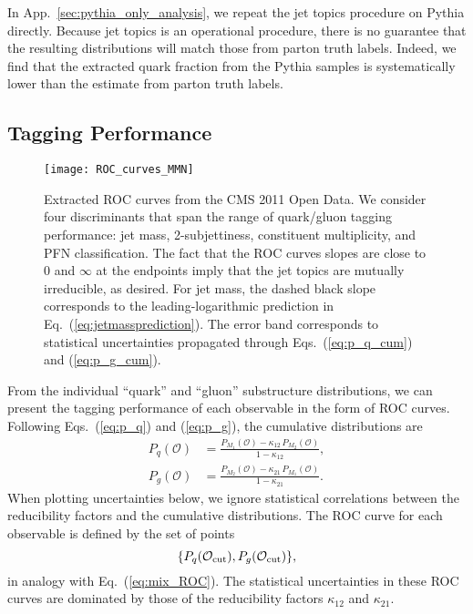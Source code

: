 \documentclass[aps,prd,twocolumn,preprintnumbers,nofootinbib,longbibliography,floatfix]{revtex4-1}
\DeclareRobustCommand{\App}[1]{App.~\ref{#1}}
\DeclareRobustCommand{\Eq}[1]{Eq.~(\ref{#1})}
\DeclareRobustCommand{\Eqs}[2]{Eqs.~(\ref{#1}) and (\ref{#2})}
\newcommand{\figO}{\mathcal{O}}
\newcommand{\ka}{\kappa}
\newcommand{\Pythia}{{\sc Pythia}\xspace}
\begin{document}
In \App{sec:pythia_only_analysis}, we repeat the jet topics procedure on \Pythia directly.
%
Because jet topics is an operational procedure, there is no guarantee that the resulting distributions will match those from parton truth labels. 
%
Indeed, we find that the extracted quark fraction from the \Pythia samples is systematically lower than the estimate from parton truth labels.


\subsection{Tagging Performance}
\label{sec:ROC_extraction}

\begin{figure}[t]
\centering
\texttt{[image: ROC\_curves\_MMN]}
\caption{
%
Extracted ROC curves from the CMS 2011 Open Data.
%
We consider four discriminants that span the range of quark/gluon tagging performance: jet mass, 2-subjettiness, constituent multiplicity, and PFN classification.
%
The fact that the ROC curves slopes are close to $0$ and $\infty$ at the endpoints imply that the jet topics are mutually irreducible, as desired.
%
For jet mass, the dashed black slope corresponds to the leading-logarithmic prediction in \Eq{eq:jetmassprediction}.
%
The error band corresponds to statistical uncertainties propagated through \Eqs{eq:p_q_cum}{eq:p_g_cum}.
}
\label{fig:ROC_extract}
\end{figure}


From the individual ``quark'' and ``gluon'' substructure distributions, we can present the tagging performance of each observable in the form of ROC curves.
%
Following \Eqs{eq:p_q}{eq:p_g}, the cumulative distributions are
%
\begin{align}
\label{eq:p_q_cum}
P_q(\figO) & =\frac{P_{M_1}(\figO)-\ka_{12}\, P_{M_2}(\figO)}{1-\ka_{12}},\\
\label{eq:p_g_cum}
P_g(\figO) &=\frac{P_{M_2}(\figO)-\ka_{21}\, P_{M_1}(\figO)}{1-\ka_{21}}.
\end{align}
%
When plotting uncertainties below, we ignore statistical correlations between the reducibility factors and the cumulative distributions.
%
The ROC curve for each observable is defined by the set of points 
%
\begin{equation}
\label{eq:pure_ROC}
\{P_{q}(\figO_{\rm cut}), P_{g}(\figO_{\rm cut})\},
\end{equation}
%
in analogy with \Eq{eq:mix_ROC}.
%
The statistical uncertainties in these ROC curves are dominated by those of the reducibility factors $\kappa_{12}$ and $ \kappa_{21}$.
\end{document}
